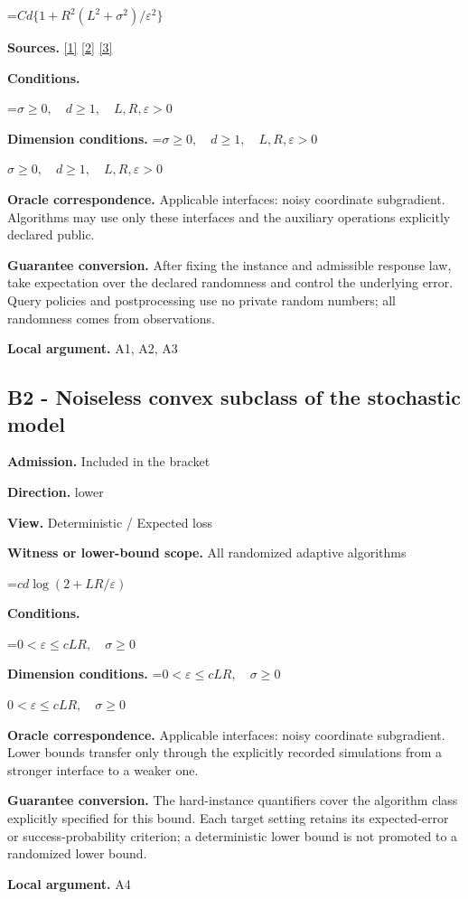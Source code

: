 \documentclass[10pt,a4paper]{article}
\newcommand{\AtlasMath}[1]{\par\begingroup\centering\setbox0=\hbox{$\displaystyle #1$}\ifdim\wd0>1.4\linewidth\typeout{ATLAS WIDE FORMULA: \the\wd0}\fi\ifdim\wd0>\linewidth\resizebox{\linewidth}{!}{\box0}\else\box0\fi\par\endgroup}
\newcommand{\AtlasInlineMath}[1]{\begingroup\setbox0=\hbox{$#1$}\ifdim\wd0>.4\linewidth\endgroup\AtlasMath{#1}\else\endgroup$#1$\fi}
\begin{document}
\AtlasMath{Cd\{1+R^2(L^2+\sigma^2)/\varepsilon^2\}}
\textbf{Sources.} \href{https://arxiv.org/pdf/1405.4980}{[1]} \href{https://www2.isye.gatech.edu/~nemirovs/MOR_AccuracyCertificates.pdf}{[2]} \href{https://arxiv.org/pdf/2609.20701}{[3]}

\textbf{Conditions.} 
\AtlasMath{\sigma\ge0,\quad d\ge1,\quad L,R,\varepsilon>0}


\textbf{Dimension conditions.} \AtlasInlineMath{\sigma\ge0,\quad d\ge1,\quad L,R,\varepsilon>0}

\textbf{Oracle correspondence.} Applicable interfaces: noisy coordinate subgradient. Algorithms may use only these interfaces and the auxiliary operations explicitly declared public.

\textbf{Guarantee conversion.} After fixing the instance and admissible response law, take expectation over the declared randomness and control the underlying error. Query policies and postprocessing use no private random numbers; all randomness comes from observations.

\textbf{Local argument.} A1, A2, A3

\subsection{B2 - Noiseless convex subclass of the stochastic model}
\textbf{Admission.} Included in the bracket

\textbf{Direction.} lower

\textbf{View.} Deterministic / Expected loss

\textbf{Witness or lower-bound scope.} All randomized adaptive algorithms

\AtlasMath{cd\log(2+LR/\varepsilon)}
\textbf{Conditions.} 
\AtlasMath{0<\varepsilon\le cLR,\quad\sigma\ge0}


\textbf{Dimension conditions.} \AtlasInlineMath{0<\varepsilon\le cLR,\quad\sigma\ge0}

\textbf{Oracle correspondence.} Applicable interfaces: noisy coordinate subgradient. Lower bounds transfer only through the explicitly recorded simulations from a stronger interface to a weaker one.

\textbf{Guarantee conversion.} The hard-instance quantifiers cover the algorithm class explicitly specified for this bound. Each target setting retains its expected-error or success-probability criterion; a deterministic lower bound is not promoted to a randomized lower bound.

\textbf{Local argument.} A4
\end{document}
